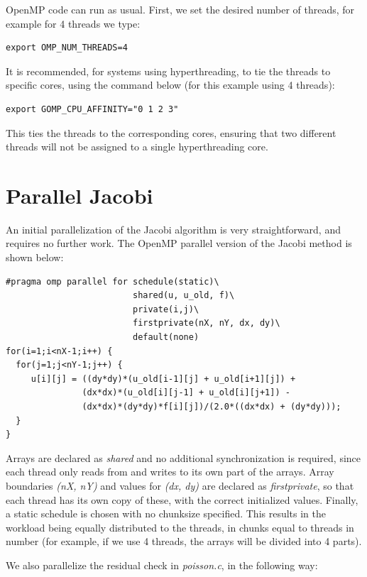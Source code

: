 \documentclass[11pt]{report}
\begin{document}
OpenMP code can run as usual. First, we set the desired number of threads, for example for 4 threads we type:

\begin{lstlisting}
export OMP_NUM_THREADS=4
\end{lstlisting}

It is recommended, for systems using hyperthreading, to tie the threads to specific cores, using the command below (for this example using 4 threads):

\begin{lstlisting}
export GOMP_CPU_AFFINITY="0 1 2 3"
\end{lstlisting}

This ties the threads to the corresponding cores, ensuring that two different threads will not be assigned to a single hyperthreading core.

\section{Parallel Jacobi}
An initial parallelization of the Jacobi algorithm is very straightforward, and requires no further work. The OpenMP parallel version of the Jacobi method is shown below:

\begin{lstlisting}
#pragma omp parallel for schedule(static)\
                         shared(u, u_old, f)\
                         private(i,j)\
                         firstprivate(nX, nY, dx, dy)\
                         default(none)
for(i=1;i<nX-1;i++) {
  for(j=1;j<nY-1;j++) {
     u[i][j] = ((dy*dy)*(u_old[i-1][j] + u_old[i+1][j]) + 
               (dx*dx)*(u_old[i][j-1] + u_old[i][j+1]) - 
               (dx*dx)*(dy*dy)*f[i][j])/(2.0*((dx*dx) + (dy*dy)));
  }
}
\end{lstlisting}

Arrays are declared as \emph{shared} and no additional synchronization is required, since each thread only reads from and writes to its own part of the arrays. Array boundaries \emph{(nX, nY)} and values for \emph{(dx, dy)} are declared as \emph{firstprivate}, so that each thread has its own copy of these, with the correct initialized values. Finally, a static schedule is chosen with no chunksize specified. This results in the workload being equally distributed to the threads, in chunks equal to threads in number (for example, if we use 4 threads, the arrays will be divided into 4 parts).
\newline

We also parallelize the residual check in \emph{poisson.c}, in the following way:
\end{document}
